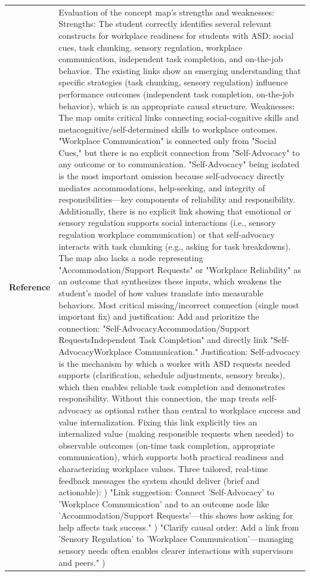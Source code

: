\begin{longtable}{@{}l p{13cm}@{}}
  \textbf{Reference} & Evaluation of the concept map's strengths and weaknesses: \newline Strengths: The student correctly identifies several relevant constructs for workplace readiness for students with ASD: social cues, task chunking, sensory regulation, workplace communication, independent task completion, and on-the-job behavior. The existing links show an emerging understanding that specific strategies (task chunking, sensory regulation) influence performance outcomes (independent task completion, on-the-job behavior), which is an appropriate causal structure. \newline Weaknesses: The map omits critical links connecting social-cognitive skills and metacognitive/self-determined skills to workplace outcomes. "Workplace Communication" is connected only from "Social Cues," but there is no explicit connection from "Self-Advocacy" to any outcome or to communication. "Self-Advocacy" being isolated is the most important omission because self-advocacy directly mediates accommodations, help-seeking, and integrity of responsibilities---key components of reliability and responsibility. Additionally, there is no explicit link showing that emotional or sensory regulation supports social interactions (i.e., sensory regulation workplace communication) or that self-advocacy interacts with task chunking (e.g., asking for task breakdowns). The map also lacks a node representing "Accommodation/Support Requests" or "Workplace Reliability" as an outcome that synthesizes these inputs, which weakens the student's model of how values translate into measurable behaviors. \newline Most critical missing/incorrect connection (single most important fix) and justification: \newline Add and prioritize the connection: "Self-AdvocacyAccommodation/Support RequestsIndependent Task Completion" and directly link "Self-AdvocacyWorkplace Communication." Justification: Self-advocacy is the mechanism by which a worker with ASD requests needed supports (clarification, schedule adjustments, sensory breaks), which then enables reliable task completion and demonstrates responsibility. Without this connection, the map treats self-advocacy as optional rather than central to workplace success and value internalization. Fixing this link explicitly ties an internalized value (making responsible requests when needed) to observable outcomes (on-time task completion, appropriate communication), which supports both practical readiness and characterizing workplace values. \newline Three tailored, real-time feedback messages the system should deliver (brief and actionable): \newline 1) "Link suggestion: Connect 'Self-Advocacy' to 'Workplace Communication' and to an outcome node like 'Accommodation/Support Requests'---this shows how asking for help affects task success." \newline 2) "Clarify causal order: Add a link from 'Sensory Regulation' to 'Workplace Communication'---managing sensory needs often enables clearer interactions with supervisors and peers." \newline 3) 
\end{longtable}
